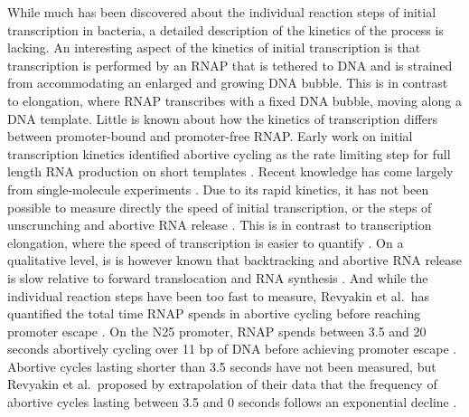 While much has been discovered about the individual reaction steps of initial
transcription in bacteria, a detailed description of the kinetics of the
process is lacking. An interesting aspect of the kinetics of initial
transcription is that transcription is performed by an RNAP that is tethered to
DNA and is strained from accommodating an enlarged and growing DNA bubble.
This is in contrast to elongation, where RNAP transcribes with a fixed DNA
bubble, moving along a DNA template. Little is known about how the kinetics of
transcription differs between promoter-bound and promoter-free RNAP. Early
work on initial transcription kinetics identified abortive cycling as the rate
limiting step for full length RNA production on short templates
\cite{stefano_lac_1979, munson_abortive_1981}. Recent knowledge has come
largely from single-molecule experiments \cite{revyakin_abortive_2006,
kapanidis_initial_2006, tang_real-time_2009, kapanidis_retention_2005,
margeat_direct_2006}. Due to its rapid kinetics, it has not been possible to
measure directly the speed of initial transcription, or the steps of
unscrunching and abortive RNA release \cite{revyakin_abortive_2006,
margeat_direct_2006}. This is in contrast to transcription elongation, where
the speed of transcription is easier to quantify \cite{wang_force_1998,
tolic-norrelykke_diversity_2004, bai_mechanochemical_2007}. On a qualitative
level, is is however known that backtracking and abortive RNA release is slow
relative to forward translocation and RNA synthesis
\cite{revyakin_abortive_2006, margeat_direct_2006}. And while the individual
reaction steps have been too fast to measure, Revyakin et al.\ has quantified
the total time RNAP spends in abortive cycling before reaching promoter escape
\cite{revyakin_abortive_2006}. On the N25 promoter, RNAP spends between 3.5
and 20 seconds abortively cycling over 11 bp of DNA before achieving promoter
escape \cite{revyakin_abortive_2006}. Abortive cycles lasting shorter than 3.5
seconds have not been measured, but Revyakin et al.\ proposed by extrapolation
of their data that the frequency of abortive cycles lasting between 3.5 and 0
seconds follows an exponential decline \cite{revyakin_abortive_2006}.  

